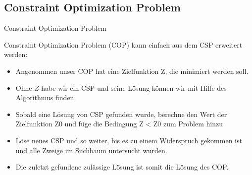 \documentclass[hyperref={pdfpagelabels=false}]{beamer}
\begin{document}
\subsection{Constraint Optimization Problem}
\begin{frame}{Constraint Optimization Problem}

	{\color{darkred} Constraint Optimization Problem} ({\color{darkred}COP}) kann einfach aus dem CSP erweitert werden:
	\begin{itemize}
	\item Angenommen unser COP hat eine Zielfunktion Z, die minimiert werden soll. 
	
	\item Ohne $Z$ habe wir ein CSP und seine Lösung können wir
	mit Hilfe des Algorithmus finden.
	
	\item Sobald eine Lösung von CSP
	gefunden wurde, berechne den Wert der Zielfunktion Z0 und füge die Bedingung Z < Z0 zum Problem hinzu 
	
	\item Löse neues CSP und so weiter, bis es zu einem Widerspruch gekommen ist und alle Zweige
	im Suchbaum untersucht wurden.
	\item Die zuletzt gefundene zulässige Lösung ist somit die Lösung des COP.
	\end{itemize}
\end{frame}
\end{document}
